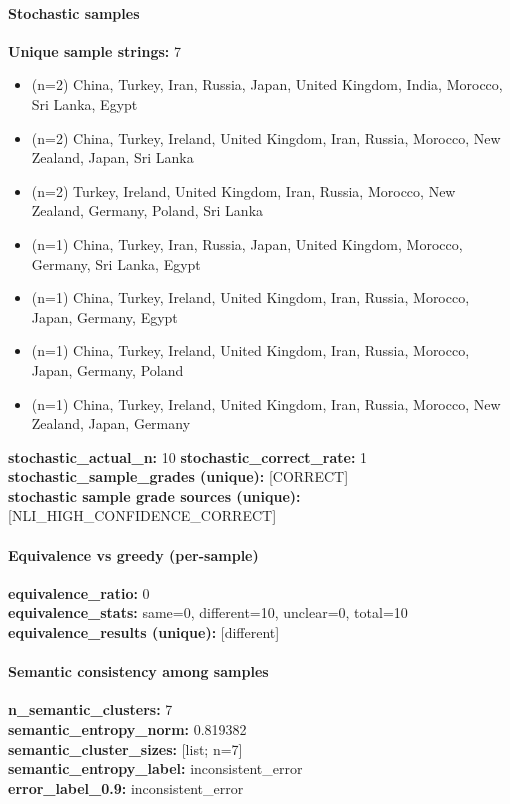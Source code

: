 \documentclass[11pt]{article}
\begin{document}
\paragraph{Stochastic samples}
\textbf{Unique sample strings:} 7\\
\small
\begin{itemize}
\item (n=2) China, Turkey, Iran, Russia, Japan, United Kingdom, India, Morocco, Sri Lanka, Egypt
\item (n=2) China, Turkey, Ireland, United Kingdom, Iran, Russia, Morocco, New Zealand, Japan, Sri Lanka
\item (n=2) Turkey, Ireland, United Kingdom, Iran, Russia, Morocco, New Zealand, Germany, Poland, Sri Lanka
\item (n=1) China, Turkey, Iran, Russia, Japan, United Kingdom, Morocco, Germany, Sri Lanka, Egypt
\item (n=1) China, Turkey, Ireland, United Kingdom, Iran, Russia, Morocco, Japan, Germany, Egypt
\item (n=1) China, Turkey, Ireland, United Kingdom, Iran, Russia, Morocco, Japan, Germany, Poland
\item (n=1) China, Turkey, Ireland, United Kingdom, Iran, Russia, Morocco, New Zealand, Japan, Germany
\end{itemize}
\normalsize
\textbf{stochastic\_actual\_n:} 10 \quad \textbf{stochastic\_correct\_rate:} 1\\
\textbf{stochastic\_sample\_grades (unique):} [CORRECT]\\
\textbf{stochastic sample grade sources (unique):} [NLI\_HIGH\_CONFIDENCE\_CORRECT]\\
\paragraph{Equivalence vs greedy (per-sample)}
\textbf{equivalence\_ratio:} 0\\
\textbf{equivalence\_stats:} same=0, different=10, unclear=0, total=10\\
\textbf{equivalence\_results (unique):} [different]\\
\paragraph{Semantic consistency among samples}
\textbf{n\_semantic\_clusters:} 7\\
\textbf{semantic\_entropy\_norm:} 0.819382\\
\textbf{semantic\_cluster\_sizes:} [list; n=7]\\
\textbf{semantic\_entropy\_label:} inconsistent\_error\\
\textbf{error\_label\_0.9:} inconsistent\_error\\
\end{document}
